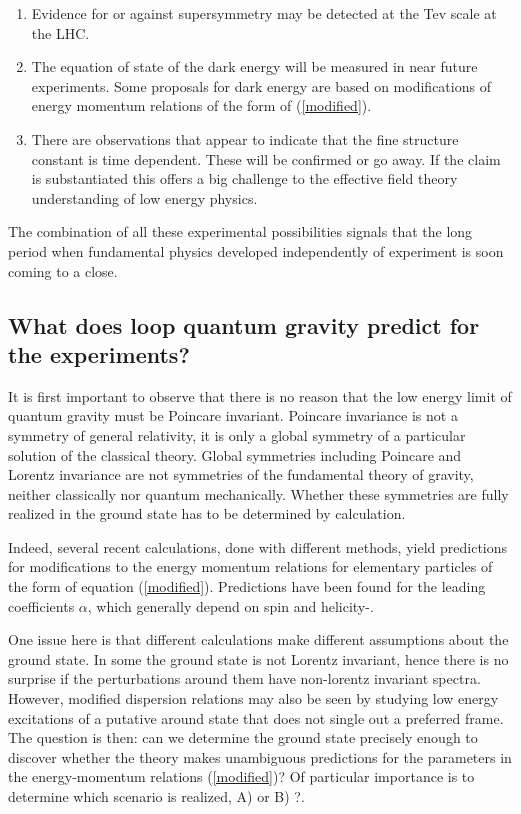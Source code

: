 \documentclass[12pt]{article}
\begin{document}
\begin{enumerate}

\item{}Evidence for or against supersymmetry may be detected at the Tev scale
at the LHC.

\item{}The equation of state of the dark energy will be measured
in near future experiments. Some proposals for dark energy\cite{laura-dark} are based on
modifications of energy momentum relations of the form of (\ref{modified}).

\item{}There are observations that appear to indicate that 
the fine structure constant is time
dependent\cite{fine}. These will be confirmed or go away. If the claim is
substantiated this offers a big challenge to the effective field theory
understanding of low energy physics.

\end{enumerate}

The combination of all these experimental possibilities signals that the
long period when fundamental physics developed independently of
experiment is soon coming to a close. 
    

\subsection{What does loop quantum gravity predict for the 
  experiments?}
  
  
It is first important to observe 
that there is no reason that  the low energy limit of quantum gravity must be
Poincare  invariant. Poincare invariance is not a symmetry of general
relativity, it is only a global symmetry of a particular
solution of the classical  theory.
Global symmetries including Poincare and Lorentz invariance 
are not symmetries of the fundamental
theory of gravity, neither classically nor quantum mechanically.  
Whether these symmetries are fully realized in the ground state
has to be determined by calculation.

Indeed, several recent calculations, done with
  different methods\cite{GP,AMU,positive},
  yield predictions for modifications to the energy
  momentum relations for elementary particles of the form of
  equation (\ref{modified}).
Predictions have been found for the leading coefficients $\alpha$,
which generally depend on spin and helicity\cite{GP}-\cite{positive}.

One issue here is that different
calculations make different assumptions about the ground state. In
some the ground state is not Lorentz invariant, hence there is no 
surprise if the perturbations around them have non-lorentz invariant
spectra. However, modified dispersion relations may also be seen 
by studying low energy excitations of a putative around state that does 
not single out a preferred 
frame\cite{positive}. The question is then: can we determine
the ground state precisely enough to discover whether the theory makes
unambiguous predictions for the parameters in the energy-momentum
relations (\ref{modified})?  Of particular importance is to determine
which scenario is realized, A) or B) ?. 
  
\end{document}

